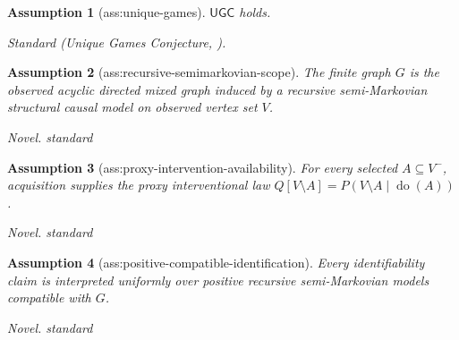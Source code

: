 \documentclass{article}
\newtheorem{assumption}{Assumption}
\begin{document}
\begin{assumption}[ass:unique-games]\label{ass:unique-games}
\(\mathsf{UGC}\) holds.
\par\smallskip\noindent\emph{Standard} (Unique Games Conjecture, \cite{KhotRegev2008}).
\end{assumption}

\begin{assumption}[ass:recursive-semimarkovian-scope]\label{ass:recursive-semimarkovian-scope}
The finite graph \(G\) is the observed acyclic directed mixed graph induced by a recursive semi-Markovian structural causal model on observed vertex set \(V\).
\par\smallskip\noindent\emph{Novel.} standard
\end{assumption}

\begin{assumption}[ass:proxy-intervention-availability]\label{ass:proxy-intervention-availability}
For every selected \(A\subseteq V^{-}\), acquisition supplies the proxy interventional law \(Q[V\setminus A]=P(V\setminus A\mid\operatorname{do}(A))\).
\par\smallskip\noindent\emph{Novel.} standard
\end{assumption}

\begin{assumption}[ass:positive-compatible-identification]\label{ass:positive-compatible-identification}
Every identifiability claim is interpreted uniformly over positive recursive semi-Markovian models compatible with \(G\).
\par\smallskip\noindent\emph{Novel.} standard
\end{assumption}
\end{document}
